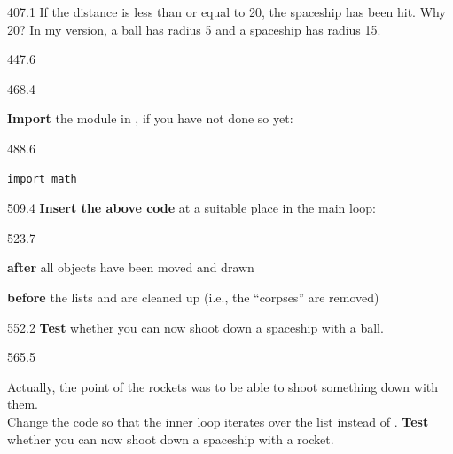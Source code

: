 \documentclass{aslab}
\begin{document}
\begin{region}[pitch=13.2]{407.1}
If the distance is less than or equal to 20, the spaceship has been hit. Why
20? In my version, a ball has radius 5 and a spaceship has radius 15.
\end{region}

\begin{region}{447.6}
\end{region}

\begin{region}{468.4}
\begin{ntasks}
\item \textbf{Import} the module  in , if you
  have not done so yet:
\end{ntasks}
\end{region}

\begin{region}[x=74.7,right=0]{488.6}
\begin{lstlisting}[style=py]
import math
\end{lstlisting}
\end{region}

\begin{region}[x=74.7,right=0]{509.4}
\textbf{Insert the above code} at a suitable place in the main loop:
\end{region}

\begin{region}[x=74.7,right=0,pitch=14.25]{523.7}
\begin{bullets}
\item \textbf{after} all objects have been moved and drawn
\item \textbf{before} the lists  and  are cleaned up
  (i.e., the ``corpses'' are removed)
\end{bullets}
\end{region}

\begin{region}[x=74.7,right=0]{552.2}
\textbf{Test} whether you can now shoot down a spaceship with a ball.
\end{region}

\begin{region}[pitch=13.85]{565.5}
\begin{ntasks}[start=2]
\item Actually, the point of the rockets was to be able to shoot something
  down with them.\\
  Change the code so that the inner loop iterates over the list
   instead of . \textbf{Test} whether you can now
  shoot down a spaceship with a rocket.
\end{ntasks}
\end{region}
\end{document}
